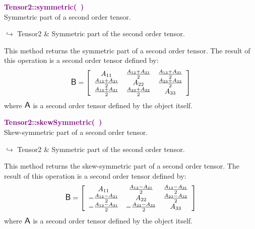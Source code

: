 \textcolor{purple}{\textbf{Tensor2::symmetric(~)}}\label{Tensor2::symmetric()}\\
Symmetric part of a second order tensor.\vspace*{-0.5em}
\begin{tcolorbox}[grow to left by=-1cm, width=\textwidth-1cm,myArgs,tabularx={l|R}]
$\hookrightarrow$ Tensor2 & Symmetric part of the second order tensor.
\end{tcolorbox}

This method returns the symmetric part of a second order tensor.
The result of this operation is a second order tensor defined by:
\begin{equation*}
\mbox{\large\ensuremath{\mathsf{B}}} = \left[\begin{array}{ccc}
 A_{11} & \frac{A_{12} + A_{21}}{2} & \frac{A_{13} + A_{31}}{2}\\
 \frac{A_{12} + A_{21}}{2} & A_{22} & \frac {A_{23} + A_{32}}{2}\\
 \frac{A_{13} + A_{31}}{2} & \frac {A_{23} + A_{32}}{2} & A_{33}\end{array}
\right]
\end{equation*}
where $\mbox{\large\ensuremath{\mathsf{A}}}$ is a second order tensor defined by the object itself.

\textcolor{purple}{\textbf{Tensor2::skewSymmetric(~)}}\label{Tensor2::skewSymmetric()}\\
Skew-symmetric part of a second order tensor.\vspace*{-0.5em}
\begin{tcolorbox}[grow to left by=-1cm, width=\textwidth-1cm,myArgs,tabularx={l|R}]
$\hookrightarrow$ Tensor2 & Symmetric part of the second order tensor.
\end{tcolorbox}

This method returns the skew-symmetric part of a second order tensor.
The result of this operation is a second order tensor defined by:
\begin{equation*}
\mbox{\large\ensuremath{\mathsf{B}}} = \left[\begin{array}{ccc}
 A_{11} & \frac{A_{12} - A_{21}}{2} & \frac{A_{13} - A_{31}}{2}\\
 -\frac{A_{12} -  A_{21}}{2} & A_{22} & \frac {A_{23} - A_{32}}{2}\\
 -\frac{A_{13} - A_{31}}{2} & -\frac {A_{23} - A_{32}}{2} & A_{33}\end{array}
\right]
\end{equation*}
where $\mbox{\large\ensuremath{\mathsf{A}}}$ is a second order tensor defined by the object itself.

